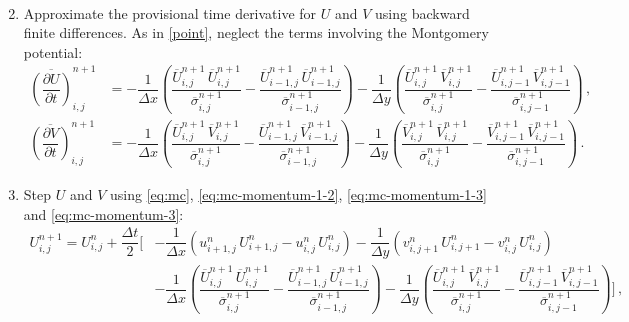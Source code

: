 \documentclass{article}
\numberwithin{equation}{section}
\begin{document}
\begin{enumerate}
\begin{subequations}
\begin{align}
					\end{align}
				\end{subequations}
			\item Approximate the provisional time derivative for $U$ and $V$ using backward finite differences. As in \ref{point}, neglect the terms involving the Montgomery potential:
				\begin{subequations}
					\label{eq:mc-momentum-3}
					\begin{align}
						\overline{\left( \dfrac{\partial U}{\partial t} \right)}_{i,j}^{n+1} & = - \dfrac{1}{\Delta x} \left( \dfrac{\overline{U}_{i,j}^{n+1} \, \overline{U}_{i,j}^{n+1}}{\overline{\sigma}_{i,j}^{n+1}} - \dfrac{\overline{U}_{i-1,j}^{n+1} \, \overline{U}_{i-1,j}^{n+1}}{\overline{\sigma}_{i-1,j}^{n+1}} \right) - \dfrac{1}{\Delta y} \left( \dfrac{\overline{U}_{i,j}^{n+1} \, \overline{V}_{i,j}^{n+1}}{\overline{\sigma}_{i,j}^{n+1}} - \dfrac{\overline{U}_{i,j-1}^{n+1} \, \overline{V}_{i,j-1}^{n+1}}{\overline{\sigma}_{i,j-1}^{n+1}} \right) \, , \\
						\overline{\left( \dfrac{\partial V}{\partial t} \right)}_{i,j}^{n+1} & = - \dfrac{1}{\Delta x} \left( \dfrac{\overline{U}_{i,j}^{n+1} \, \overline{V}_{i,j}^{n+1}}{\overline{\sigma}_{i,j}^{n+1}} - \dfrac{\overline{U}_{i-1,j}^{n+1} \, \overline{V}_{i-1,j}^{n+1}}{\overline{\sigma}_{i-1,j}^{n+1}} \right) - \dfrac{1}{\Delta y} \left( \dfrac{\overline{V}_{i,j}^{n+1} \, \overline{V}_{i,j}^{n+1}}{\overline{\sigma}_{i,j}^{n+1}} - \dfrac{\overline{V}_{i,j-1}^{n+1} \, \overline{V}_{i,j-1}^{n+1}}{\overline{\sigma}_{i,j-1}^{n+1}} \right) \, .
					\end{align}
				\end{subequations}
			\item Step $U$ and $V$ using \eqref{eq:mc}, \eqref{eq:mc-momentum-1-2}, \eqref{eq:mc-momentum-1-3} and \eqref{eq:mc-momentum-3}:
				\begin{equation}
					\tag{2.17a}
					\begin{aligned}
						U_{i,j}^{n+1} = U_{i,j}^n + \dfrac{\Delta t}{2} \Biggl[ & - \dfrac{1}{\Delta x} \left( u_{i+1,j}^n \, U_{i+1,j}^n - u_{i,j}^n \, U_{i,j}^n \right) - \dfrac{1}{\Delta y} \left( v_{i,j+1}^n \, U_{i,j+1}^n - v_{i,j}^n \, U_{i,j}^n \right)  \\ 
						& - \dfrac{1}{\Delta x} \left( \dfrac{\overline{U}_{i,j}^{n+1} \, \overline{U}_{i,j}^{n+1}}{\overline{\sigma}_{i,j}^{n+1}} - \dfrac{\overline{U}_{i-1,j}^{n+1} \, \overline{U}_{i-1,j}^{n+1}}{\overline{\sigma}_{i-1,j}^{n+1}} \right) - \dfrac{1}{\Delta y} \left( \dfrac{\overline{U}_{i,j}^{n+1} \, \overline{V}_{i,j}^{n+1}}{\overline{\sigma}_{i,j}^{n+1}} - \dfrac{\overline{U}_{i,j-1}^{n+1} \, \overline{V}_{i,j-1}^{n+1}}{\overline{\sigma}_{i,j-1}^{n+1}} \right) \Biggr] \, , 

\end{aligned}
\end{equation}
\end{enumerate}
\end{document}
